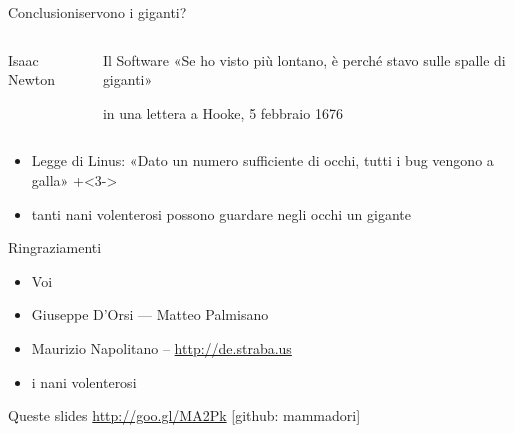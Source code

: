 \documentclass[italian,compress,red]{beamer}
\begin{document}
\begin{frame}{Conclusioni}{servono i giganti?}
  \begin{columns}[T]
  \begin{column}{.3\textwidth}
    \begin{block}{Isaac Newton}
      \begin{center}
      \end{center}
      \end{block}

  \end{column} 
  \begin{column}{.7\textwidth}
    \begin{exampleblock}{Il Software}
      «Se ho visto più lontano, è perché stavo sulle spalle di giganti»
      \vfill
      \begin{tiny} in una lettera a Hooke, 5 febbraio 1676\end{tiny}
      
    \end{exampleblock}   
  \end{column}
  \end{columns}
  
  \begin{itemize}
   \onslide+<2->
   \item Legge di Linus: «Dato un numero sufficiente di occhi, tutti i bug vengono a galla» 
   \onslide+<3->
   \item tanti nani volenterosi possono guardare negli occhi un gigante
  \end{itemize}


\end{frame}


\begin{frame}[<+->]{Ringraziamenti}
 \begin{itemize}
  \item Voi
  \item Giuseppe D'Orsi --- Matteo Palmisano
  \item Maurizio Napolitano -- \url{http://de.straba.us}
  \item i nani volenterosi
 \end{itemize}
 
  \begin{block}{Queste slides}
  \url{http://goo.gl/MA2Pk} [github: mammadori]
  \end{block}

\end{frame}
\end{document}
